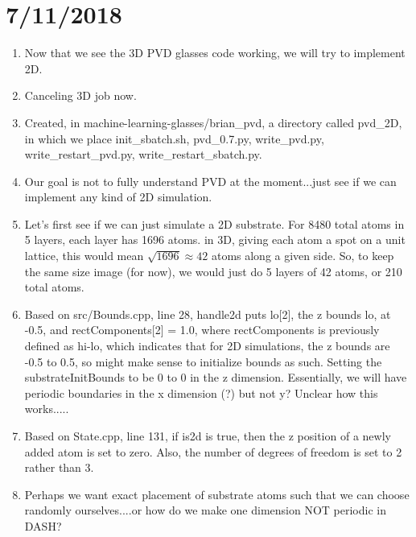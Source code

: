 \documentclass[12pt,reqno]{amsart}
\numberwithin{equation}{section}
\begin{document}
\section{7/11/2018}
\begin{enumerate}
\item Now that we see the 3D PVD glasses code working, we will try to implement 2D.  
\item Canceling 3D job now.  
\item Created, in machine-learning-glasses/brian\_pvd, a directory called pvd\_2D, in which we place init\_sbatch.sh, pvd\_0.7.py, write\_pvd.py, write\_restart\_pvd.py, write\_restart\_sbatch.py.  
\item Our goal is not to fully understand PVD at the moment...just see if we can implement any kind of 2D simulation.  
\item Let's first see if we can just simulate a 2D substrate.  For 8480 total atoms in 5 layers, each layer has 1696 atoms.  in 3D, giving each atom a spot on a unit lattice, this would mean $\sqrt{1696} \approx 42$ atoms along a given side.  So, to keep the same size image (for now), we would just do 5 layers of 42 atoms, or 210 total atoms.  
\item Based on src/Bounds.cpp, line 28, handle2d puts lo[2], the z bounds lo, at -0.5, and rectComponents[2] = 1.0, where rectComponents is previously defined as hi-lo, which indicates that for 2D simulations, the z bounds are -0.5 to 0.5, so might make sense to initialize bounds as such.  Setting the substrateInitBounds to be 0 to 0 in the z dimension.  Essentially, we will have periodic boundaries in the x dimension (?) but not y?  Unclear how this works.....
\item Based on State.cpp, line 131, if is2d is true, then the z position of a newly added atom is set to zero.  Also, the number of degrees of freedom is set to 2 rather than 3.  
\item Perhaps we want exact placement of substrate atoms such that we can choose randomly ourselves....or how do we make one dimension NOT periodic in DASH?  
\end{enumerate}
\end{document}
